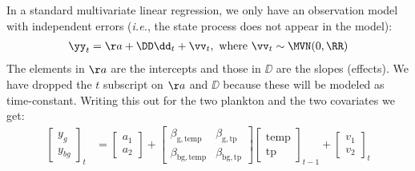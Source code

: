 In a standard multivariate linear regression, we only have an observation model with independent errors (\emph{i.e.}, the state process does not appear in the model):
\begin{equation}
\begin{gathered}
\yy_t = \aa + \DD\dd_t + \vv_t, \text{ where } \vv_t \sim \MVN(0,\RR) 
\end{gathered}
\end{equation}
The elements in $\aa$ are the intercepts and those in $\DD$ are the slopes (effects).  We have dropped the $t$ subscript on $\aa$ and $\DD$ because these will be modeled as time-constant.  Writing this out for the two plankton and the two covariates we get:
\begin{equation}
\begin{split}
 \begin{bmatrix}
    y_{g} \\
    y_{bg} \end{bmatrix}_t &=
\begin{bmatrix}
    a_1 \\
    a_2 \end{bmatrix} +
 \begin{bmatrix}
    \beta_{\mathrm{g,temp}}&\beta_{\mathrm{g,tp}} \\
    \beta_{\mathrm{bg,temp}}&\beta_{\mathrm{bg,tp}}  \end{bmatrix} 
 \begin{bmatrix}
    \mathrm{temp} \\
    \mathrm{tp} \end{bmatrix}_{t-1} +
 \begin{bmatrix}
    v_{1} \\
    v_{2} \end{bmatrix}_t 
\end{split}   
\label{eq:dfa1}\end{equation}


